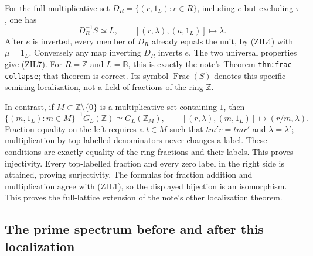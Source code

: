 For the full multiplicative set
$D_R=\{(r,1_L):r\in R\}$, including $e$ but excluding $\tau$,
one has
\begin{equation}\tag{ZIL7}
 D_R^{-1}S\simeq L,\qquad
 [(r,\lambda),(a,1_L)]\longmapsto\lambda.
\end{equation}
After $e$ is inverted, every member of $D_R$ already equals the
unit, by (ZIL4) with $\mu=1_L$. Conversely any map inverting
$D_R$ inverts $e$. The two universal properties give (ZIL7).
For $R=\mathbb Z$ and $L=\mathbb B$, this is exactly the note's
Theorem \texttt{thm:frac-collapse}; that theorem is correct.
Its symbol $\operatorname{Frac}(S)$ denotes this specific semiring
localization, not a field of fractions of the ring $\mathbb Z$.

In contrast, if $M\subset\mathbb Z\setminus\{0\}$ is a
multiplicative set containing $1$, then
\begin{equation}\tag{ZIL8}
 \{(m,1_L):m\in M\}^{-1}G_L(\mathbb Z)
       \simeq G_L(\mathbb Z_M),\qquad
 [(r,\lambda),(m,1_L)]\longmapsto(r/m,\lambda).
\end{equation}
Fraction equality on the left requires a $t\in M$ such that
$t m' r=t m r'$ and $\lambda=\lambda'$; multiplication by
top-labelled denominators never changes a label. These conditions
are exactly equality of the ring fractions and their labels.
This proves injectivity. Every top-labelled fraction and every
zero label in the right side is attained, proving surjectivity.
The formulas for fraction addition and multiplication agree with
(ZIL1), so the displayed bijection is an isomorphism. This proves
the full-lattice extension of the note's other localization theorem.

\subsection{The prime spectrum before and after this localization}

